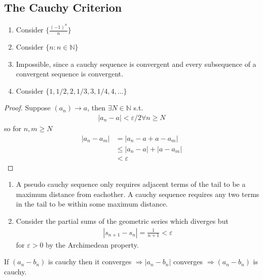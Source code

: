 \subsection{The Cauchy Criterion}

\begin{enumerate}[label=(\alph*)]
    \item Consider $\{ \frac{(-1)^n}{n} \}$
    \item Consider $\{ n : n \in \mathbb{N} \}$
    \item Impossible, since a cauchy sequence is convergent and every 
    subsequence of a convergent sequence is convergent.
    \item Consider $\{ 1, 1/2, 2, 1/3, 3, 1/4, 4, ... \}$ 
\end{enumerate}

\begin{proof}
    Suppose $(a_n) \rightarrow a$, then $\exists N \in \mathbb{N}$ s.t.
    \begin{align*}
        |a_n-a| < \varepsilon/2 \forall n \geq N
    \end{align*}
    so for $n,m \geq N$
    \begin{align*}
        |a_n - a_m| &= |a_n - a + a - a_m| \\
                    &\leq |a_n - a| + |a - a_m| \\
                    &< \varepsilon
    \end{align*}
\end{proof}

\begin{enumerate}[label=(\alph*)]
    \item A pseudo cauchy sequence only requires adjacent terms of the tail to 
    be a maximum distance from eachother. A cauchy sequence requires any two  
    terms in the tail to be within some maximum distance.

    \item 
    Consider the partial sums of the geometric series which diverges but
    \begin{align*}
        |s_{n+1} - s_n| = \frac{1}{n+1} < \varepsilon
    \end{align*}
    for $\varepsilon > 0$ by the Archimedean property.
\end{enumerate}

If $(a_n - b_n)$ is cauchy then it converges 
$\Rightarrow |a_n - b_n|$ converges $\Rightarrow (a_n - b_n)$ is cauchy.


